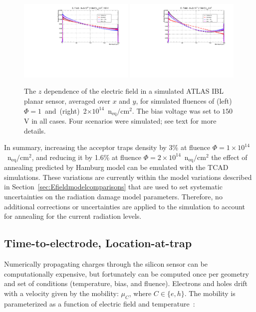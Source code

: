 \begin{figure}[!htpb]
\centering
\includegraphics[width=0.49\textwidth]{TCAD_EField_variations_1e14_150V.pdf}
\includegraphics[width=0.49\textwidth]{TCAD_EField_variations_2e14_150V.pdf}
\caption{\label{fig:EFieldTCADAnnealing}The $z$ dependence of the electric field in a simulated ATLAS IBL planar sensor, averaged over $x$ and $y$, for  simulated
  fluences of (left)~$\Phi=1$~and~(right)~2$\times10^{14}$~n$_\text{eq}/\text{cm}^{2}$. The
bias voltage was set to $150$ V in all cases. Four scenarios were simulated; see text for more 
  details.}
\end{figure}

In summary, increasing the acceptor traps density by 3\% at fluence 
$\Phi=1\times10^{14}$~n$_\text{eq}/\text{cm}^{2}$, and reducing it by 1.6\% 
at fluence $\Phi=2\times10^{14}$~n$_\text{eq}/\text{cm}^{2}$ the effect of annealing 
predicted by Hamburg model can be emulated with the TCAD simulations.   These variations are currently within the model variations described in Section~\ref{sec:Efieldmodelcomparisons} that are used to set systematic uncertainties on the radiation damage model parameters.  Therefore, no additional corrections or uncertainties are applied to the simulation to account for annealing for the current radiation levels.


\subsection{Time-to-electrode, Location-at-trap}
\label{sec:maps}

Numerically propagating charges through the silicon sensor can be computationally expensive, but fortunately can be computed once per geometry and set of conditions (temperature, bias, and fluence).   Electrons and holes drift with a velocity given by the mobility: $\mu_C$, where $C\in\{e,h\}$.  The mobility is parameterized as a function of electric field and temperature~\cite{JACOBONI197777}:


